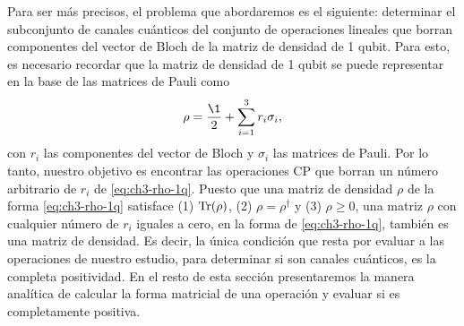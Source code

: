 Para ser más precisos, el problema que abordaremos es
el siguiente: determinar el subconjunto de canales cuánticos
del conjunto de operaciones lineales que borran componentes 
del vector de Bloch de la matriz de densidad de 1 qubit.
Para esto, es necesario recordar que la matriz de densidad 
de 1 qubit se puede representar en la base de las matrices 
de Pauli como
\begin{align}
\rho = \frac{\1}{2}+\sum_{i=1}^{3}r_i\sigma_i,
\label{eq:ch3-rho-1q}
\end{align}
con $r_i$ las componentes del vector de Bloch y $\sigma_i$ las 
matrices de Pauli. Por lo tanto, nuestro objetivo es encontrar
las operaciones CP que borran un número arbitrario de 
$r_i$ de \eqref{eq:ch3-rho-1q}. Puesto que una matriz de 
densidad $\rho$ de la forma \eqref{eq:ch3-rho-1q} satisface
(1) $\Tr(\rho)$, (2) $\rho=\rho^{\dagger}$ y (3) $\rho\geq0$, 
una matriz $\rho$ con cualquier número de $r_i$ iguales a cero,
en la forma de \eqref{eq:ch3-rho-1q}, también es una matriz
de densidad. Es decir, la única condición que resta por 
evaluar a las operaciones de nuestro estudio, para determinar
si son canales cuánticos, es la completa positividad. 
En el resto de esta sección presentaremos la manera 
analítica de calcular la forma matricial de una operación
y evaluar si es completamente positiva.
%
%

